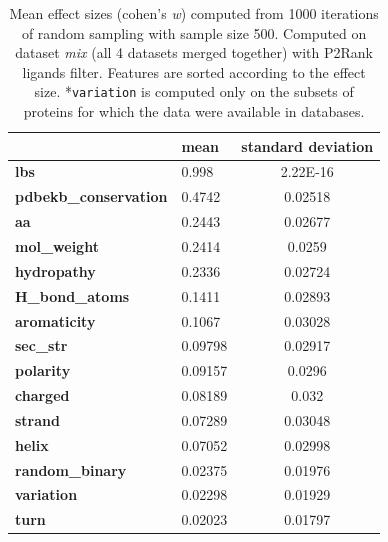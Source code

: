 \begin{table}[!htbp]
\centering
\begin{tabular}{@{}llc@{}}
\toprule
                              & \textbf{mean} & \textbf{standard deviation} \\ \midrule
\textbf{lbs}                  & 0.998         & 2.22E-16                    \\
\textbf{pdbekb\_conservation} & 0.4742        & 0.02518                     \\
\textbf{aa}                   & 0.2443        & 0.02677                     \\
\textbf{mol\_weight}          & 0.2414        & 0.0259                      \\
\textbf{hydropathy}           & 0.2336        & 0.02724                     \\
\textbf{H\_bond\_atoms}       & 0.1411        & 0.02893                     \\
\textbf{aromaticity}          & 0.1067        & 0.03028                     \\
\textbf{sec\_str}             & 0.09798       & 0.02917                     \\
\textbf{polarity}             & 0.09157       & 0.0296                      \\
\textbf{charged}              & 0.08189       & 0.032                       \\
\textbf{strand}               & 0.07289       & 0.03048                     \\
\textbf{helix}                & 0.07052       & 0.02998                     \\
\textbf{random\_binary}       & 0.02375       & 0.01976                     \\
\textbf{variation}            & 0.02298       & 0.01929                     \\
\textbf{turn}                 & 0.02023       & 0.01797                     \\ \bottomrule
\end{tabular}
\caption{Mean effect sizes (cohen's \textit{w}) computed from 1000 iterations of random sampling with sample size 500. Computed on dataset \textit{mix} (all 4 datasets merged together) with P2Rank ligands filter. Features are sorted according to the effect size.
\hspace{\textwidth}
*\texttt{variation} is computed only on the subsets of proteins for which the data were available in databases.}
\label{tab:cohensw500}
\end{table}


